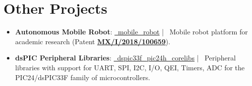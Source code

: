 \documentclass[letterpaper,11pt]{article}
\newcommand{\resumeItem}[2]{
  \item\small{
    \textbf{#1}{: #2 \vspace{-2pt}}
  }
}
\newcommand{\resumeSubItem}[2]{\resumeItem{#1}{#2}\vspace{-1pt}}
\newcommand{\resumeSubHeadingListStart}{\begin{itemize}[leftmargin=*]}
\newcommand{\resumeSubHeadingListEnd}{\end{itemize}\vspace{5pt}}
\def \Patent{https://drive.google.com/file/d/1DsnaAByaBixFv9GfyCH6JUAA95fj8aTY/view}
\begin{document}
\section{Other Projects}
  \resumeSubHeadingListStart
    \resumeSubItem{Autonomous Mobile Robot}
      {\href{https://github.com/datgeezus/mobile_robot}{\faGithub \, mobile\_robot}
      | \, Mobile robot platform for academic research (Patent \textbf{\href{\Patent}{MX/I/2018/100659}}). }
    \resumeSubItem{dsPIC Peripheral Libraries}
      {\href{https://github.com/datgeezus/dspic33f_pic24h_corelibs}{\faGithub \, dspic33f\_pic24h\_corelibs} 
      | \,  Peripheral libraries with support for UART, SPI, I2C, I/O, QEI, Timers, ADC for the PIC24/dsPIC33F 
      family of microcontrollers.}
  \resumeSubHeadingListEnd


 
\end{document}
